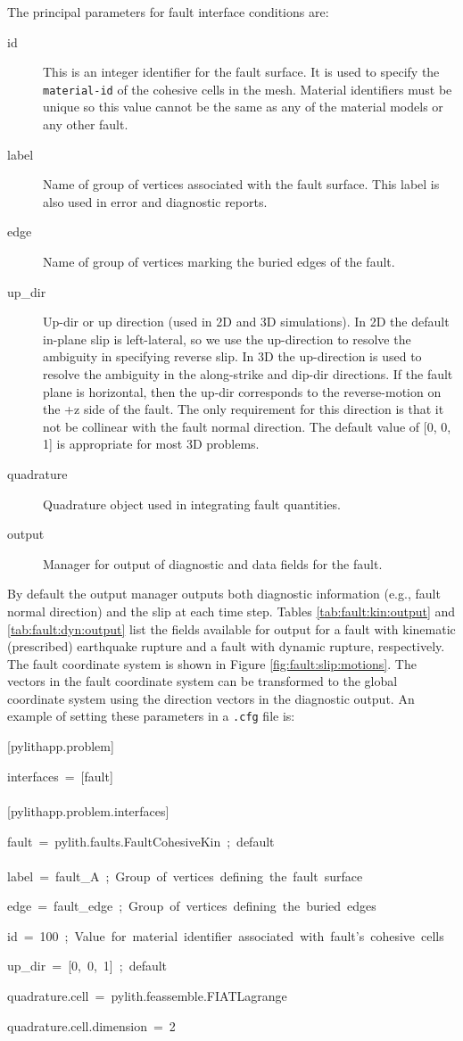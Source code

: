 The principal parameters for fault interface conditions are:
\begin{description}
\item [{id}] This is an integer identifier for the fault surface. It is
used to specify the \texttt{material-id} of the cohesive cells in
the mesh. Material identifiers must be unique so this value cannot
be the same as any of the material models or any other fault.
\item [{label}] Name of group of vertices associated with the fault surface.
This label is also used in error and diagnostic reports.
\item [{edge}] Name of group of vertices marking the buried edges of the
fault.
\item [{up\_dir}] Up-dir or up direction (used in 2D and 3D simulations).
In 2D the default in-plane slip is left-lateral, so we use the up-direction
to resolve the ambiguity in specifying reverse slip. In 3D the up-direction
is used to resolve the ambiguity in the along-strike and dip-dir directions.
If the fault plane is horizontal, then the up-dir corresponds to the
reverse-motion on the +z side of the fault. The only requirement for
this direction is that it not be collinear with the fault normal direction.
The default value of {[}0, 0, 1{]} is appropriate for most 3D problems.
\item [{quadrature}] Quadrature object used in integrating fault quantities.
\item [{output}] Manager for output of diagnostic and data fields for the
fault.
\end{description}
By default the output manager outputs both diagnostic information
(e.g., fault normal direction) and the slip at each time step. Tables
\vref{tab:fault:kin:output} and \vref{tab:fault:dyn:output} list the
fields available for output for a fault with kinematic (prescribed)
earthquake rupture and a fault with dynamic rupture, respectively.
The fault coordinate system is shown in Figure \vref{fig:fault:slip:motions}.
The vectors in the fault coordinate system can be transformed to the
global coordinate system using the direction vectors in the diagnostic
output. An example of setting these parameters in a \texttt{.cfg}
file is:
\begin{lyxcode}
{[}pylithapp.problem{]}

interfaces~=~{[}fault{]}~\\
~\\
{[}pylithapp.problem.interfaces{]}

fault~=~pylith.faults.FaultCohesiveKin~;~default~\\
~\\
label~=~fault\_A~;~Group~of~vertices~defining~the~fault~surface

edge~=~fault\_edge~;~Group~of~vertices~defining~the~buried~edges

id~=~100~;~Value~for~material~identifier~associated~with~fault's~cohesive~cells

up\_dir~=~{[}0,~0,~1{]}~;~default

quadrature.cell~=~pylith.feassemble.FIATLagrange

quadrature.cell.dimension~=~2
\end{lyxcode}
